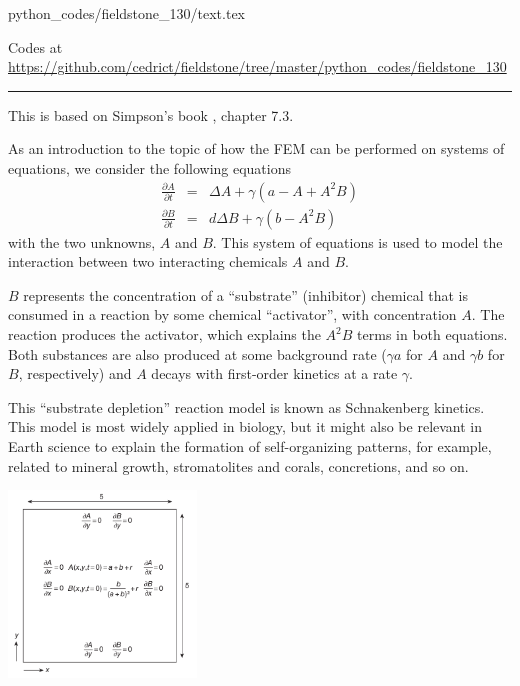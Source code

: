 \begin{flushright} {\tiny {\color{gray} python\_codes/fieldstone\_130/text.tex}} \end{flushright}

%

\begin{center}
Codes at \url{https://github.com/cedrict/fieldstone/tree/master/python_codes/fieldstone_130}
\end{center}

\par\noindent\rule{\textwidth}{0.4pt}


This is based on Simpson's book \cite{simp17}, chapter 7.3.

As an introduction to the topic of how the FEM can be
performed on systems of equations, we consider the following equations
\begin{eqnarray}
\frac{\partial A}{\partial t} &=& \Delta A  + \gamma (a-A+A^2B) \\
\frac{\partial B}{\partial t} &=& d \Delta B  + \gamma (b-A^2B) 
\end{eqnarray}
with the two unknowns, $A$ and $B$. This system of equations is used to model the interaction between
two interacting chemicals $A$ and $B$.

$B$ represents the concentration of
a ``substrate'' (inhibitor) chemical that is consumed in a reaction by some chemical ``activator'',
with concentration $A$. The reaction produces the activator, which explains the $A^2B$ terms in both
equations. Both substances are also produced at some background rate ($\gamma a$ for $A$ and $\gamma b$ for $B$,
respectively) and $A$ decays with first-order kinetics at a rate $\gamma$.

This ``substrate depletion'' reaction
model is known as Schnakenberg kinetics. This
model is most widely applied in biology, but it might also be relevant in Earth science to explain
the formation of self-organizing patterns, for example, related to mineral growth, stromatolites and
corals, concretions, and so on.

\begin{center}
\includegraphics[width=5cm]{python_codes/fieldstone_130/images/simpson1}
\end{center}

